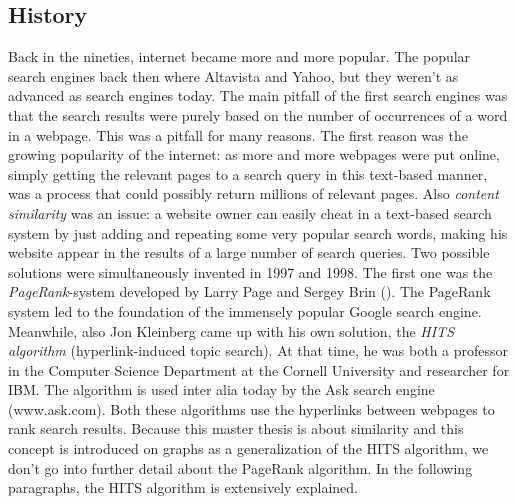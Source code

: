 \documentclass[a4paper,11pt]{report}
\begin{document}
\subsection{History}
Back in the nineties, internet became more and more popular. The popular search 
engines back then where Altavista and Yahoo, but they weren't as advanced as 
search engines today. The main pitfall of the first search engines was that the search results 
were purely based on the number of occurrences of a word in a webpage. This was 
a pitfall for many reasons. The first reason was the growing popularity of the 
internet: as more and more webpages were put online, simply getting the relevant 
pages to a search query in this text-based manner, was a process that could possibly return millions 
of relevant pages. Also \emph{content similarity} was an issue: a website owner 
can easily cheat in a text-based search system by just adding and repeating some 
very popular search words, making his website appear in the results of a large 
number of search queries.
Two possible solutions were simultaneously invented in 1997 and 1998. The first 
one was the
\textit{PageRank}-system developed by Larry Page and Sergey 
Brin (\cite{page}). The PageRank system led to the foundation of the immensely popular Google 
search engine. Meanwhile, also Jon Kleinberg came up with his own solution, the\textit{ HITS algorithm} (hyperlink-induced topic search). At that time,
he was both a professor in the Computer Science Department at the Cornell University and researcher for IBM. The algorithm is 
used inter alia today by the Ask search engine (www.ask.com).
Both these algorithms use the hyperlinks between webpages to rank search 
results. 
Because this master thesis is about similarity and this concept is 
introduced on graphs as a generalization of the HITS algorithm, we don't go into 
further detail about the PageRank algorithm. In the following paragraphs, the 
HITS algorithm is extensively explained.
\end{document}
